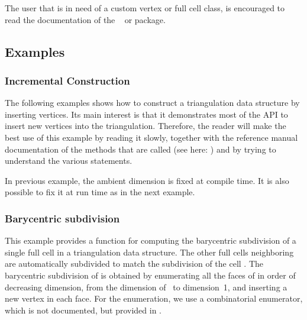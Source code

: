 \begin{ccAdvanced}
The user that is in need of a custom vertex or full cell class, is
encouraged to read the documentation of the \cgal\
  or   package. 
\end{ccAdvanced}


\subsection{Examples\label{triangulation:tds:examples}}

\subsubsection{Incremental Construction}
The following examples shows how to construct a triangulation data structure by
inserting vertices. Its main interest is that it demonstrates most of the API
to insert new vertices into the triangulation. Therefore, the reader will make
the best use of this example by reading it slowly, together with the reference
manual documentation of the methods that are called (see here:
) and by trying to understand the various 
\ccc{assert(...)} statements.


In previous example, the ambient dimension is fixed at compile time.
It is also possible to fix it at run time as in the next example.


\subsubsection{Barycentric subdivision}
This example provides a function for computing the barycentric subdivision of a
single full cell  in a triangulation data structure. The other full
cells neighboring  are automatically subdivided to match the
subdivision of the cell . The barycentric subdivision of \ccc{fc} is
obtained by enumerating all the faces of  in order of decreasing
dimension, from the dimension of~\ccc{fc} to dimension~1, and inserting a new
vertex in each face. For the enumeration, we use a combinatorial enumerator,
which is not documented, but provided in \cgal.
 

